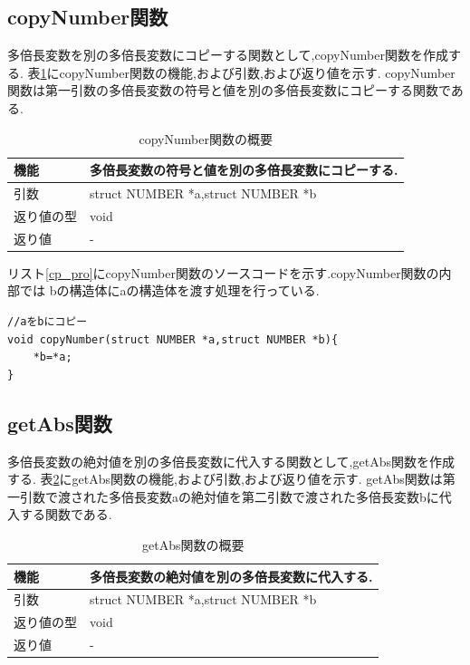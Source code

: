 \documentclass[a4j] {jarticle}
\begin{document}
\subsection{copyNumber関数}
多倍長変数を別の多倍長変数にコピーする関数として,copyNumber関数を作成する.
表\ref{copyNumber}にcopyNumber関数の機能,および引数,および返り値を示す.
copyNumber関数は第一引数の多倍長変数の符号と値を別の多倍長変数にコピーする関数である.
\begin{table}[H]
  \caption{copyNumber関数の概要}
  \label{copyNumber}
  \begin{center}
      \begin{tabular}{|l|l|}\hline
      機能 & 多倍長変数の符号と値を別の多倍長変数にコピーする.\\ \hline
      引数 & struct NUMBER *a,struct NUMBER *b\\ \hline
      返り値の型 & void\\ \hline
      返り値 & -\\ \hline
      \end{tabular}
  \end{center}
  \end{table}

  リスト\ref{cp_pro}にcopyNumber関数のソースコードを示す.copyNumber関数の内部では
  bの構造体にaの構造体を渡す処理を行っている.
  \begin{lstlisting}[basicstyle=\ttfamily\footnotesize, frame=single,label=cp_pro,caption=copyNumber関数のソースコード]
//aをbにコピー
void copyNumber(struct NUMBER *a,struct NUMBER *b){
    *b=*a;
}
  \end{lstlisting}
\subsection{getAbs関数}
多倍長変数の絶対値を別の多倍長変数に代入する関数として,getAbs関数を作成する.
表\ref{getAbs}にgetAbs関数の機能,および引数,および返り値を示す.
getAbs関数は第一引数で渡された多倍長変数aの絶対値を第二引数で渡された多倍長変数bに代入する関数である.
\begin{table}[H]
  \caption{getAbs関数の概要}
  \label{getAbs}
  \begin{center}
      \begin{tabular}{|l|l|}\hline
      機能 & 多倍長変数の絶対値を別の多倍長変数に代入する.\\ \hline
      引数 & struct NUMBER *a,struct NUMBER *b\\ \hline
      返り値の型 & void\\ \hline
      返り値 & -\\ \hline
      \end{tabular}
  \end{center}
  \end{table}
\end{document}
